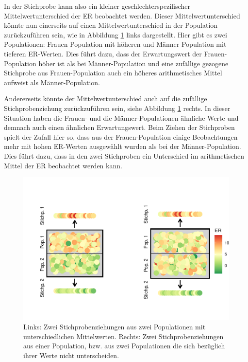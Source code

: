 \documentclass[
]{book}
\theoremstyle{definition}
\theoremstyle{definition}
\theoremstyle{definition}
\theoremstyle{definition}
\theoremstyle{remark}
\begin{document}
In der Stichprobe kann also ein kleiner geschlechterspezifischer Mittelwertunterschied der ER beobachtet werden. Dieser Mittelwertunterschied könnte nun einerseits auf einen Mittelwertunterschied in der Population zurückzuführen sein, wie in Abbildung \ref{fig:exm-breakup-bagplot} links dargestellt. Hier gibt es zwei Populationen: Frauen-Population mit höheren und Männer-Population mit tieferen ER-Werten. Dies führt dazu, dass der Erwartungswert der Frauen-Population höher ist als bei Männer-Population und eine zufällige gezogene Stichprobe aus Frauen-Population auch ein höheres arithmetisches Mittel aufweist als Männer-Population.

Andererseits könnte der Mittelwertunterschied auch auf die zufällige Stichprobenziehung zurückzuführen sein, siehe Abbildung \ref{fig:exm-breakup-bagplot} rechts. In dieser Situation haben die Frauen- und die Männer-Populationen ähnliche Werte und demnach auch einen ähnlichen Erwartungswert. Beim Ziehen der Stichproben spielt der Zufall hier so, dass aus der Frauen-Population einige Beobachtungen mehr mit hohen ER-Werten ausgewählt wurden als bei der Männer-Population. Dies führt dazu, dass in den zwei Stichproben ein Unterschied im arithmetischen Mittel der ER beobachtet werden kann.

\begin{figure}
\centering
\includegraphics{aps_statistik1_files/figure-latex/exm-breakup-bagplot-1.pdf}
\caption{\label{fig:exm-breakup-bagplot}Links: Zwei Stichprobenziehungen aus zwei Populationen mit unterschiedlichen Mittelwerten. Rechts: Zwei Stichprobenziehungen aus einer Population, bzw. aus zwei Populationen die sich bezüglich ihrer Werte nicht unterscheiden.}
\end{figure}
\end{document}

